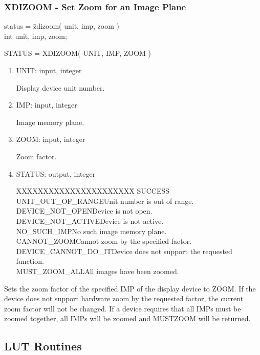 \subsubsection{XDIZOOM - Set Zoom for an Image Plane}
\begin{tabbing}
status = \=zdizoom( unit, imp, zoom )\\
\>int  unit, imp, zoom;\\
\end{tabbing}
STATUS = XDIZOOM( UNIT, IMP, ZOOM )
\begin{enumerate}
\item UNIT:  input, integer

Display device unit number.
\item IMP:  input, integer

Image memory plane.
\item ZOOM:  input, integer

Zoom factor.
\item STATUS:  output, integer
\begin{tabbing}
XXXXXXXXXXXXXXXXXXXXXX\=\kill
SUCCESS\\
UNIT\_OUT\_OF\_RANGE\>Unit number is out of range.\\
DEVICE\_NOT\_OPEN\>Device is not open.\\
DEVICE\_NOT\_ACTIVE\>Device is not active.\\
NO\_SUCH\_IMP\>No such image memory plane.\\
CANNOT\_ZOOM\>Cannot zoom by the specified factor.\\
DEVICE\_CANNOT\_DO\_IT\>Device does not support the requested function.\\
MUST\_ZOOM\_ALL\>All images have been zoomed.\\
\end{tabbing}
\end{enumerate}
Sets the zoom factor of the 
specified IMP of the display device to ZOOM.  If the device does not
support hardware zoom by the requested factor, the current zoom
factor will not be changed.  If a device requires that all IMPs
must be zoomed together, all IMPs will be zoomed and
MUSTZOOM will be returned.
\newpage
\subsection{LUT Routines}
